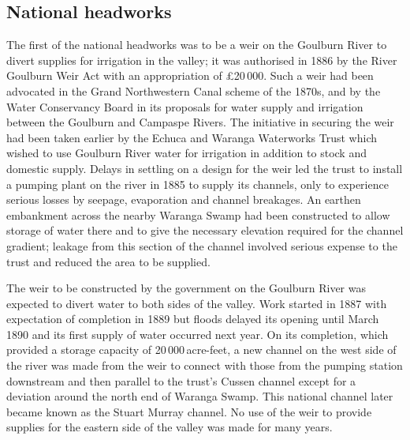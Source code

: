 \subsection*{National headworks} 

The first of the national headworks was to be a weir on the
Goulburn River  to divert
supplies for irrigation in the valley; it was authorised in 1886 by
the River Goulburn Weir Act  with an appropriation of \pounds20\,000.  Such a weir had
been advocated in the Grand Northwestern Canal scheme
 of the 1870s, and by the Water
Conservancy Board in its proposals for water supply and irrigation
between the Goulburn and Campaspe Rivers.  The initiative in securing
the weir had been taken earlier by the Echuca and Waranga Waterworks
Trust  which wished to use
Goulburn River water for irrigation in addition to stock and domestic
supply.  Delays in settling on a design for the weir led the trust to
install a pumping plant on the river in 1885 to supply its channels,
only to experience serious losses by seepage,
evaporation and channel breakages.  An earthen
embankment across the nearby Waranga Swamp had
been constructed to allow storage of water there and to give the
necessary elevation required for the channel gradient; leakage from
this section of the channel involved serious expense to the trust and
reduced the area to be supplied.

The weir  to be constructed by the government on
the Goulburn River was expected to divert water to both sides of the
valley.  Work started in 1887 with expectation of completion in 1889
but \index{flood}floods delayed its opening until March 1890 and its
first supply of water occurred next year.  On its completion, which
provided a storage capacity of 20\,000\,ac\-re-feet, a new
channel on the west side of the
river was made from the weir to connect with those from the pumping
station downstream and then parallel to the trust's Cussen channel
except for a deviation around the north end of Waranga Swamp.  This
national channel later became known as the \index{channel!Stuart
Murray}Stuart Murray channel.  No use of the weir to provide supplies
for the eastern side of the valley was made for many
years.

